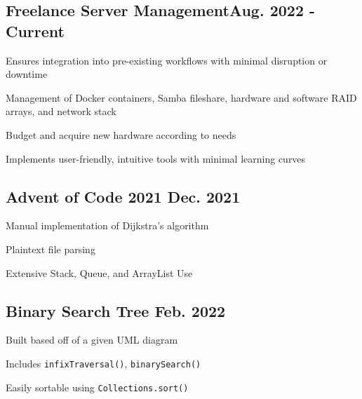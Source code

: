 \documentclass[letter,10pt]{article}
\begin{document}
\subsection{{Freelance Server Management\hfill Aug. 2022 - Current}}
\begin{zitemize}
	\item Ensures integration into pre-existing workflows with minimal disruption or downtime
    \item Management of Docker containers, Samba fileshare, hardware and software RAID arrays, and network stack
	\item Budget and acquire new hardware according to needs
    \item Implements user-friendly, intuitive tools with minimal learning curves
\end{zitemize}

\subsection{{Advent of Code 2021 \hfill Dec. 2021}}
\begin{zitemize}
	\item Manual implementation of Dijkstra's algorithm
	\item Plaintext file parsing
	\item Extensive Stack, Queue, and ArrayList Use
\end{zitemize}

\subsection{{Binary Search Tree \hfill Feb. 2022}}
\begin{zitemize}
	\item Built based off of a given UML diagram
	\item Includes \verb|infixTraversal()|, \verb|binarySearch()|
	\item Easily sortable using \verb|Collections.sort()|
\end{zitemize}

\end{document}
